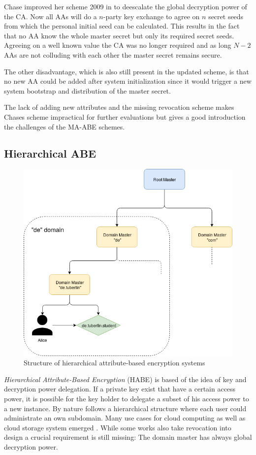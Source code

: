Chase improved her scheme 2009 in \cite{chase2009improving} to deescalate the global decryption power of the CA. Now all \ac{AA}s will do a $n$-party key exchange to agree on $n$ secret seeds from which the personal initial seed can be calculated. This results in the fact that no AA know the whole master secret but only its required secret seeds. Agreeing on a well known value the \ac{CA} was no longer required and as long $N-2$ \ac{AA}s are not colluding with each other the master secret remains secure. 

The other disadvantage, which is also still present in the updated scheme, is that no new \ac{AA} could be added after system initialization since it would trigger a new system bootstrap and distribution of the master secret. 

The lack of adding new attributes and the missing revocation scheme makes Chases scheme impractical for further evaluations but gives a good introduction the challenges of the \ac{MA-ABE} schemes.

\subsection{Hierarchical \ac{ABE}}
\label{sec:HABE}

\begin{figure}[!ht]
\centering
    \includegraphics[width=0.7\linewidth]{img/HABE.png}
    \caption{Structure of hierarchical attribute-based encryption systems}
    \label{fig:habe}
\end{figure}

\textit{Hierarchical Attribute-Based Encryption} (\ac{HABE}) is based of the idea of key and decryption power delegation. If a private key exist that have a certain access power, it is possible for the key holder to delegate a subset of his access power to a new instance. By nature follows a hierarchical structure where each user could administrate an own subdomain. Many use cases for cloud computing as well as cloud storage system emerged \cite{Wang:2010:HAE:1866307.1866414}. While some works also take revocation into design a crucial requirement is still missing:  The domain master has always global decryption power. 

